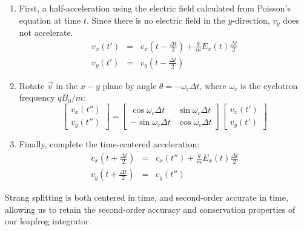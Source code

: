 \documentclass[%
 reprint,
 amsmath,amssymb,
 aps,
]{revtex4-2}
\begin{document}
\begin{enumerate}
    \item First, a half-acceleration using the electric field calculated from Poisson's equation at time $t$. Since there is no electric field in the $y$-direction, $v_y$ does not accelerate.
    \begin{eqnarray}
    v_x(t') & = & v_x \left( t - \frac{\Delta t}{2} \right) + \frac{q}{m} E_x(t) \frac{\Delta t}{2} \\
    v_y(t') & = & v_y \left( t - \frac{\Delta t}{2} \right)
    \end{eqnarray}
    \item Rotate $\vec v$ in the $x-y$ plane by angle $\theta = - \omega_c \Delta t$, where $\omega_c$ is the cyclotron frequency $q B_0 / m$:
    \begin{equation}
    \begin{bmatrix}
    v_x(t'') \\ v_y(t'') 
    \end{bmatrix} = \begin{bmatrix}
    \cos \omega_c \Delta t & \sin \omega_c \Delta t \\ - \sin \omega_c \Delta t & \cos \omega_c \Delta t
    \end{bmatrix} \begin{bmatrix}
    v_x(t') \\ v_y(t')
    \end{bmatrix}
    \end{equation}
    \item Finally, complete the time-centered acceleration:
    \begin{eqnarray}
    v_x \left( t + \frac{\Delta t}{2} \right) & = & v_x(t'') + \frac{q}{m} E_x(t) \frac{\Delta t}{2} \\
    v_y \left( t + \frac{\Delta t}{2} \right) & = & v_y(t'')
    \end{eqnarray}
\end{enumerate}
Strang splitting is both centered in time, and second-order accurate in time, allowing us to retain the second-order accuracy and conservation properties of our leapfrog integrator.
\end{document}
